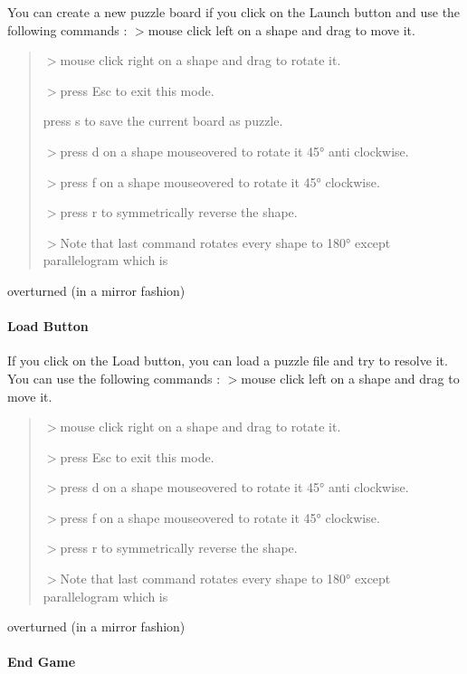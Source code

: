 You can create a new puzzle board if you click on the {\ttfamily Launch} button and use the following commands \+: $>${\ttfamily mouse click left} on a shape and drag to move it. \begin{quote}


$>${\ttfamily mouse click right} on a shape and drag to rotate it.

$>${\ttfamily press \textquotesingle{}Esc\textquotesingle{}} to exit this mode.

press \textquotesingle{}s\textquotesingle{} to save the current board as puzzle.

$>${\ttfamily press \textquotesingle{}d\textquotesingle{}} on a shape mouseovered to rotate it 45° anti clockwise.

$>${\ttfamily press \textquotesingle{}f} on a shape mouseovered to rotate it 45° clockwise.

$>${\ttfamily press \textquotesingle{}r\textquotesingle{}} to symmetrically reverse the shape.

$>$Note that last command rotates every shape to 180° except parallelogram which is \end{quote}
overturned (in a mirror fashion)

\paragraph*{Load Button}

If you click on the {\ttfamily Load} button, you can load a puzzle file and try to resolve it. You can use the following commands \+: $>${\ttfamily mouse click left} on a shape and drag to move it. \begin{quote}


$>${\ttfamily mouse click right} on a shape and drag to rotate it.

$>${\ttfamily press \textquotesingle{}Esc\textquotesingle{}} to exit this mode.

$>${\ttfamily press \textquotesingle{}d\textquotesingle{}} on a shape mouseovered to rotate it 45° anti clockwise.

$>${\ttfamily press \textquotesingle{}f} on a shape mouseovered to rotate it 45° clockwise.

$>${\ttfamily press \textquotesingle{}r\textquotesingle{}} to symmetrically reverse the shape.

$>$Note that last command rotates every shape to 180° except parallelogram which is \end{quote}
overturned (in a mirror fashion) \paragraph*{End Game}

